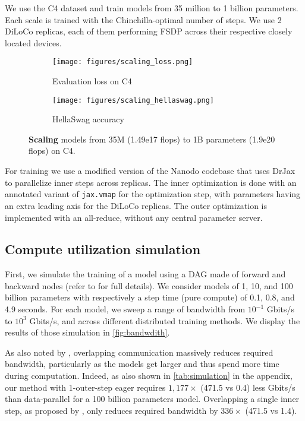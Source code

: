 We use the C4 dataset \citep{c4} and train models from 35 million to 1 billion parameters. Each scale is trained with the Chinchilla-optimal number of steps. We use 2 DiLoCo replicas, each of them performing FSDP \citep{zhao2023fsdp} across their respective closely located devices.

\begin{figure*}[t]
\centering
\captionsetup[subfigure]{justification=centering}
\begin{subfigure}{0.45\linewidth}
  \centering
  \texttt{[image: figures/scaling\_loss.png]}
  \caption{Evaluation loss on C4}
  \label{fig:scaling_loss}
\end{subfigure}\hfill
\begin{subfigure}{0.45\linewidth}
  \centering
  \texttt{[image: figures/scaling\_hellaswag.png]}
  \caption{HellaSwag accuracy}
  \label{fig:scaling_hellaswag}
\end{subfigure}
\caption{\textbf{Scaling} models from 35M (1.49e17 flops) to 1B parameters (1.9e20 flops) on C4.}
\label{fig:scaling}
\end{figure*}

For training we use a modified version of the Nanodo codebase \citep{nanodo} that uses DrJax \citep{rush2024drjax} to parallelize inner steps across replicas. The inner optimization is done with an annotated variant of \texttt{jax.vmap} for the optimization step, with parameters having an extra leading axis for the DiLoCo replicas. The outer optimization is implemented with an all-reduce, without any central parameter server.

\subsection{Compute utilization simulation}

First, we simulate the training of a model using a DAG made of forward and backward nodes (refer to \cite{douillard2025streamingdiloco} for full details). We consider models of 1, 10, and 100 billion parameters with respectively a step time (pure compute) of 0.1, 0.8, and 4.9 seconds. For each model, we sweep a range of bandwidth from $10^{-1}$ Gbits/s to $10^{3}$ Gbits/s, and across different distributed training methods. We display the results of those simulation in \autoref{fig:bandwdith}.

As also noted by \cite{douillard2025streamingdiloco}, overlapping communication massively reduces required bandwidth, particularly as the models get larger and thus spend more time during computation. Indeed, as also shown in \autoref{tab:simulation} in the appendix, our method with 1-outer-step eager requires $1{,}177\times$ (471.5 vs 0.4) less Gbits/s than data-parallel for a 100 billion parameters model. Overlapping a single inner step, as proposed by \cite{douillard2025streamingdiloco}, only reduces required bandwidth by $336\times$ (471.5 vs 1.4).




